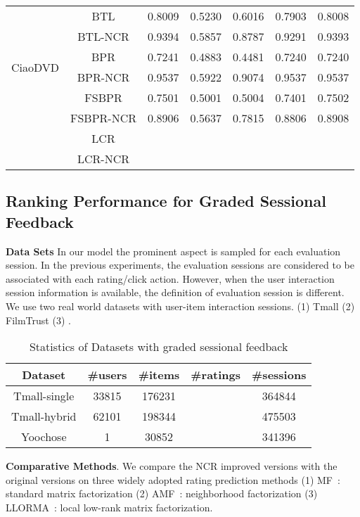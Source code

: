 \documentclass[letterpaper]{article} %
\begin{document}
\begin{table}[htp]
\begin{center}
\begin{tabular}{|c|c|c|c|c|c|c|}
\multirow{6}{*}{CiaoDVD} & BTL &0.8009 &0.5230 &0.6016 &0.7903 &0.8008 \\\cline{2-7}
 & BTL-NCR &0.9394 &0.5857 &0.8787 &0.9291 &0.9393 \\\cline{2-7}
 & BPR &0.7241 &0.4883 &0.4481 &0.7240 &0.7240 \\\cline{2-7}
 & BPR-NCR &0.9537 &0.5922 &0.9074 &0.9537 &0.9537 \\\cline{2-7}
 & FSBPR &0.7501 &0.5001 &0.5004 &0.7401 &0.7502 \\\cline{2-7}
  & FSBPR-NCR &0.8906 &0.5637 &0.7815 &0.8806 &0.8908 \\\cline{2-7}
   & LCR & & & & & \\\cline{2-7}
 & LCR-NCR & & & & & \\\hline
\end{tabular}
\end{center}
\label{tab:ratingresult}
\end{table}%




\subsection{Ranking Performance for Graded Sessional Feedback}

\textbf{Data Sets} In our model the prominent aspect is sampled for each evaluation session. In the previous experiments, the evaluation sessions are considered to be associated with each rating/click action. However, when the user interaction session information is available, the definition of evaluation session is different. We use two real world datasets with user-item interaction sessions. (1) Tmall   (2) FilmTrust (3) . 
\begin{table}[htp]
\caption{Statistics of Datasets with graded sessional feedback}
\begin{center}
\begin{tabular}{|c|c|c|c|c|}
\hline
Dataset & \#users & \#items & \#ratings & \#sessions \\\hline
Tmall-single &33815 &176231 & &364844 \\\hline
Tmall-hybrid &62101 &198344 & &475503 \\\hline
Yoochose &1 &30852 & &341396 \\\hline
\end{tabular}
\end{center}
\label{tab:datasets}
\end{table}%

\textbf{Comparative Methods}. We compare the NCR improved versions with the original versions on three widely adopted rating prediction methods (1) MF~\cite{Koren2009Matrix}: standard matrix factorization  (2) AMF~\cite{Koren2008Factorization}: neighborhood factorization (3) LLORMA~\cite{Lee2013Local}: local low-rank matrix factorization. 
\end{document}
